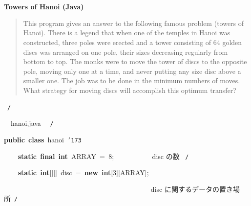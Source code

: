 \documentclass[a4paper,10pt]{article}
\def\mc{\relax}
\begin{document}
\tt\mc 

\noindent
\mbox{}\rm\mc {\tt /}{\tt *}\  \hrulefill *
\tt\mc 

\noindent
\mbox{}\hfill

\noindent
\mbox{}\rm\mc \ %

\centerline{\bf Towers of Hanoi (Java)}

\begin{quote}

This program gives an answer to the following famous problem (towers of
Hanoi).
There is a legend that when one of the temples in Hanoi was constructed,
three poles were erected and a tower consisting of 64 golden discs was
arranged on one pole, their sizes decreasing regularly from bottom to top.
The monks were to move the tower of discs to the opposite pole, moving
only one at a time, and never putting any size disc above a smaller one.
The job was to be done in the minimum numbers of moves. What strategy for
moving discs will accomplish this optimum transfer?
\end{quote}

\tt\mc 

\noindent
\mbox{}\hfill

\noindent
\mbox{}\rm\mc {\tt *} \hrulefill \rm\mc \ {\tt *}{\tt /}
\tt\mc 

\noindent
\mbox{}\hfill

\noindent
\mbox{}\rm\mc {\tt /}{\tt *}\  \hrulefill\ hanoi.java \ \hrulefill \rm\mc \ {\tt *}{\tt /}
\tt\mc 

\noindent
\mbox{}\hfill

\noindent
\mbox{}\textbf{public}{\tt\mc \ }\textbf{class}{\tt\mc \ }hanoi{\tt\mc \ }{\tt\char'173}

\noindent
\mbox{}{\tt\mc \ }{\tt\mc \ }{\tt\mc \ }{\tt\mc \ }\textbf{static}{\tt\mc \ }\textbf{final}{\tt\mc \ }\textbf{int}{\tt\mc \ }ARRAY{\tt\mc \ }={\tt\mc \ }8;{\tt\mc \ }{\tt\mc \ }{\tt\mc \ }{\tt\mc \ }{\tt\mc \ }{\tt\mc \ }{\tt\mc \ }{\tt\mc \ }{\tt\mc \ }\rm\mc {\tt /}{\tt *}\  \ disc の数 \hfill \rm\mc \ {\tt *}{\tt /}
\tt\mc 

\noindent
\mbox{}\hfill

\noindent
\mbox{}{\tt\mc \ }{\tt\mc \ }{\tt\mc \ }{\tt\mc \ }\textbf{static}{\tt\mc \ }\textbf{int}[][]{\tt\mc \ }disc{\tt\mc \ }={\tt\mc \ }\textbf{new}{\tt\mc \ }\textbf{int}[3][ARRAY];

\noindent
\mbox{}{\tt\mc \ }{\tt\mc \ }{\tt\mc \ }{\tt\mc \ }{\tt\mc \ }{\tt\mc \ }{\tt\mc \ }{\tt\mc \ }{\tt\mc \ }{\tt\mc \ }{\tt\mc \ }{\tt\mc \ }{\tt\mc \ }{\tt\mc \ }{\tt\mc \ }{\tt\mc \ }{\tt\mc \ }{\tt\mc \ }{\tt\mc \ }{\tt\mc \ }{\tt\mc \ }{\tt\mc \ }{\tt\mc \ }{\tt\mc \ }{\tt\mc \ }{\tt\mc \ }{\tt\mc \ }{\tt\mc \ }{\tt\mc \ }{\tt\mc \ }{\tt\mc \ }{\tt\mc \ }{\tt\mc \ }{\tt\mc \ }{\tt\mc \ }{\tt\mc \ }{\tt\mc \ }{\tt\mc \ }{\tt\mc \ }{\tt\mc \ }\rm\mc {\tt /}{\tt *}\  \ disc に関するデータの置き場所\hfill \rm\mc \ {\tt *}{\tt /}
\tt\mc 
\end{document}
